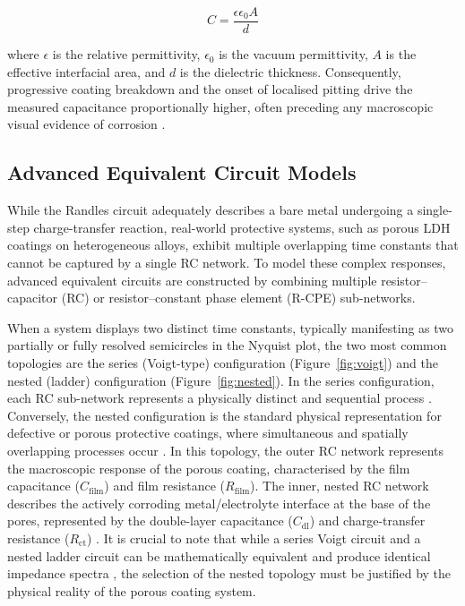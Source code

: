 \documentclass[11pt,twoside,a4paper,final]{report}
\begin{document}
\begin{equation}
    C = \frac{\epsilon \epsilon_0 A}{d} \label{eq:capacitance}
\end{equation}

where $\epsilon$ is the relative permittivity, $\epsilon_0$ is the vacuum permittivity, $A$ is the effective interfacial area, and $d$ is the dielectric thickness. Consequently, progressive coating breakdown and the onset of localised pitting drive the measured capacitance proportionally higher, often preceding any macroscopic visual evidence of corrosion \cite{Kelly2002, Lasia2014}.


\subsection{Advanced Equivalent Circuit Models}
\label{subsec:advanced_circuits}

While the Randles circuit adequately describes a bare metal undergoing a single-step charge-transfer reaction, real-world protective systems, such as porous LDH coatings on heterogeneous alloys, exhibit multiple overlapping time constants that cannot be captured by a single RC network. To model these complex responses, advanced equivalent circuits are constructed by combining multiple resistor--capacitor (RC) or resistor--constant phase element (R-CPE) sub-networks.

When a system displays two distinct time constants, typically manifesting as two partially or fully resolved semicircles in the Nyquist plot, the two most common topologies are the series (Voigt-type) configuration (Figure~\ref{fig:voigt}) and the nested (ladder) configuration (Figure~\ref{fig:nested}). In the series configuration, each RC sub-network represents a physically distinct and sequential process \cite{Lasia2014, Kelly2002}. Conversely, the nested configuration is the standard physical representation for defective or porous protective coatings, where simultaneous and spatially overlapping processes occur \cite{Kelly2002}. In this topology, the outer RC network represents the macroscopic response of the porous coating, characterised by the film capacitance ($C_{\text{film}}$) and film resistance ($R_{\text{film}}$). The inner, nested RC network describes the actively corroding metal/electrolyte interface at the base of the pores, represented by the double-layer capacitance ($C_{\text{dl}}$) and charge-transfer resistance ($R_{\text{ct}}$) \cite{Kelly2002}. It is crucial to note that while a series Voigt circuit and a nested ladder circuit can be mathematically equivalent and produce identical impedance spectra \cite{Lasia2014}, the selection of the nested topology must be justified by the physical reality of the porous coating system.
\end{document}
